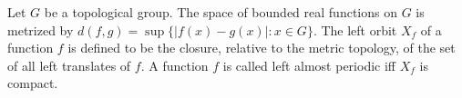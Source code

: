 Let $G$ be a topological group. The space of bounded real functions on $G$ is metrized by $d(f,g) = \sup \{ |f(x) - g(x)| : x \in G \}$. The left orbit $X_f$ of a function $f$ is defined to be the closure, relative to the metric topology, of the set of all left translates of $f$. A function $f$ is called left almost periodic iff $X_f$ is compact.
